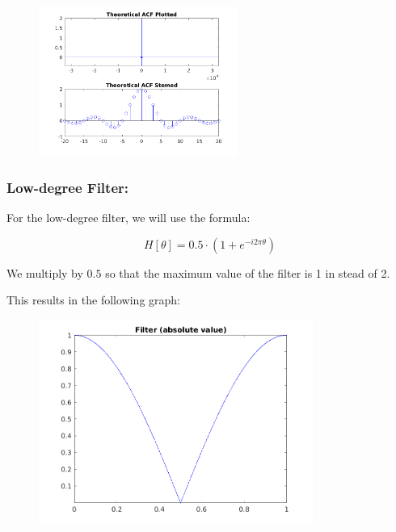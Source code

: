 \documentclass[a4paper,11pt]{article}
\begin{document}
\begin{figure}[!hp]
    \begin{center}
      \includegraphics[width=0.58\textwidth]{images/study1/r_hd_th.png}
    \end{center}
\end{figure}

\newpage

\subsubsection{Low-degree Filter:}

For the low-degree filter, we will use the formula:

\begin{equation}\label{eq:H_ld_th}
  H[\theta] = 0.5\cdot (1+e^{-i 2 \pi \theta})
\end{equation}

We multiply by $0.5$ so that the maximum value of the filter is 1 in stead of 2.

This results in the following graph:

\begin{figure}[!hp]
    \begin{center}
      \includegraphics[width=0.8\textwidth]{images/study1/H_ld_th.png}
    \end{center}
\end{figure}
\end{document}
